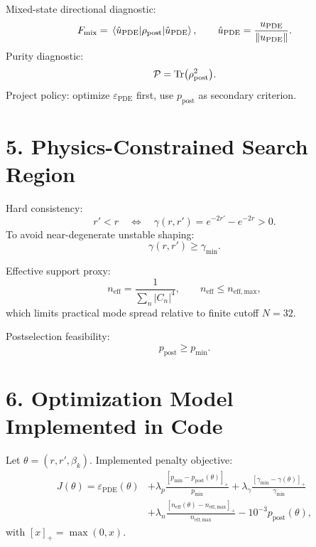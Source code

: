 \documentclass[11pt]{article}
\begin{document}
Mixed-state directional diagnostic:
\begin{equation}
F_{\mathrm{mix}}
=\mel{\hat u_{\mathrm{PDE}}}{\rho_{\mathrm{post}}}{\hat u_{\mathrm{PDE}}},
\qquad
\hat u_{\mathrm{PDE}}=\frac{u_{\mathrm{PDE}}}{\norm{u_{\mathrm{PDE}}}}.
\end{equation}
Purity diagnostic:
\begin{equation}
\mathcal{P}=\Tr(\rho_{\mathrm{post}}^2).
\end{equation}
Project policy: optimize $\varepsilon_{\mathrm{PDE}}$ first, use $p_{\mathrm{post}}$ as secondary criterion.

\section*{5. Physics-Constrained Search Region}
Hard consistency:
\begin{equation}
r' < r
\quad\Longleftrightarrow\quad
\gamma(r,r')=e^{-2r'}-e^{-2r}>0.
\end{equation}
To avoid near-degenerate unstable shaping:
\begin{equation}
\gamma(r,r')\ge \gamma_{\min}.
\end{equation}

Effective support proxy:
\begin{equation}
n_{\mathrm{eff}}=\frac{1}{\sum_n |C_n|^4},
\qquad
n_{\mathrm{eff}}\le n_{\mathrm{eff,max}},
\end{equation}
which limits practical mode spread relative to finite cutoff $N=32$.

Postselection feasibility:
\begin{equation}
p_{\mathrm{post}}\ge p_{\min}.
\end{equation}

\section*{6. Optimization Model Implemented in Code}
Let $\theta=(r,r',\beta_k)$. Implemented penalty objective:
\begin{equation}
\begin{aligned}
J(\theta)=\varepsilon_{\mathrm{PDE}}(\theta)
&+\lambda_p\frac{[p_{\min}-p_{\mathrm{post}}(\theta)]_+}{p_{\min}}
+\lambda_{\gamma}\frac{[\gamma_{\min}-\gamma(\theta)]_+}{\gamma_{\min}}\\
&+\lambda_n\frac{[n_{\mathrm{eff}}(\theta)-n_{\mathrm{eff,max}}]_+}{n_{\mathrm{eff,max}}}
-10^{-3}p_{\mathrm{post}}(\theta),
\end{aligned}
\end{equation}
with $[x]_+=\max(0,x)$.
\end{document}
